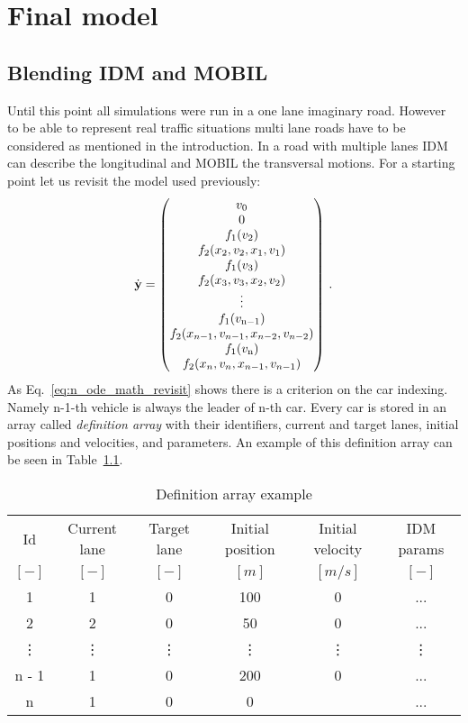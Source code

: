 \chapter{Final model}
	\section{Blending IDM and MOBIL}
		Until this point all simulations were run in a one lane imaginary road. However to be able to represent real traffic situations multi lane roads have to be considered as mentioned in the introduction. In a road with multiple lanes IDM can describe the longitudinal and MOBIL the transversal motions. For a starting point let us revisit the model used previously:
		\begin{equation}
			\dot{\textbf{y}}=
			\begin{pmatrix}
			v_0\\
			0\\
			f_1(v_{2})\\
			f_2(x_{2}, v_{2},x_{1}, v_{1})\\
			f_1(v_{3})\\
			f_2(x_{3}, v_{3},x_{2}, v_{2})\\
			\vdots\\
			f_1(v_{\rm n-1})\\
			f_2(x_{n-1}, v_{n-1},x_{n-2}, v_{n-2})\\
			f_1(v_{\rm n})\\
			f_2(x_{n}, v_{n},x_{n-1}, v_{n-1})
			\end{pmatrix}\,.
			\label{eq:n_ode_math_revisit}
		\end{equation}
		As Eq.~\eqref{eq:n_ode_math_revisit} shows there is a criterion on the car indexing. Namely n-1-th vehicle is always the leader of n-th car. Every car is stored in an array called \textit{definition array} with their identifiers, current and target lanes, initial positions and velocities, and parameters. An example of this definition array can be seen in Table~\ref{tab:definition_array}.
		\begin{table}
			\begin{center}
				\begin{tabular}{ |c|c|c|c|c|c| }
					\hline
					Id & Current lane & Target lane & Initial position & Initial velocity& IDM params\\
					$[-]$ & $[-]$ & $[-]$ & $[m]$ & $[m/s]$ & $[-]$\\
					\hline
					1 & 1 & 0 & 100 & 0 & ...\\
					2 & 2 & 0 & 50 & 0 & ...\\
					\vdots & \vdots & \vdots & \vdots & \vdots & \vdots\\
					n - 1 & 1 & 0 & 200 & 0 & ...\\
					n & 1 & 0 & 0 & & ...\\
					\hline
				\end{tabular}
			\end{center}
			\caption{Definition array example}
			\label{tab:definition_array}
		\end{table}

